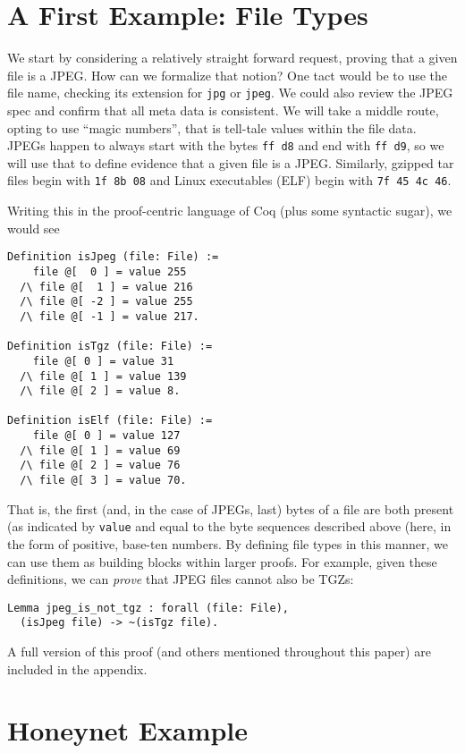 \documentclass[nocopyrightspace]{sigplanconf}
\begin{document}
\section{A First Example: File Types}

We start by considering a relatively straight forward request, proving that a
given file is a JPEG. How can we formalize that notion? One tact would be to
use the file name, checking its extension for {\tt jpg} or {\tt jpeg}. We
could also review the JPEG spec and confirm that all meta data is consistent.
We will take a middle route, opting to use ``magic numbers'', that is
tell-tale values within the file data. JPEGs happen to always start with the
bytes {\tt ff d8} and end with {\tt ff d9}, so we will use that to define
evidence that a given file is a JPEG. Similarly, gzipped tar files begin with
{\tt 1f 8b 08} and Linux executables (ELF) begin with {\tt 7f 45 4c 46}.

Writing this in the proof-centric language of Coq (plus some syntactic sugar),
we would see

\begin{lstlisting}
Definition isJpeg (file: File) :=
    file @[  0 ] = value 255
  /\ file @[  1 ] = value 216 
  /\ file @[ -2 ] = value 255
  /\ file @[ -1 ] = value 217.

Definition isTgz (file: File) :=
    file @[ 0 ] = value 31
  /\ file @[ 1 ] = value 139 
  /\ file @[ 2 ] = value 8.

Definition isElf (file: File) :=
    file @[ 0 ] = value 127
  /\ file @[ 1 ] = value 69 
  /\ file @[ 2 ] = value 76
  /\ file @[ 3 ] = value 70.
\end{lstlisting}

That is, the first (and, in the case of JPEGs, last) bytes of a file are both
present (as indicated by {\tt value} and equal to the byte sequences described
above (here, in the form of positive, base-ten numbers. By defining file types
in this manner, we can use them as building blocks within larger proofs. For
example, given these definitions, we can {\it prove} that JPEG files cannot
also be TGZs:

\begin{lstlisting}
Lemma jpeg_is_not_tgz : forall (file: File),
  (isJpeg file) -> ~(isTgz file).
\end{lstlisting}

A full version of this proof (and others mentioned throughout this paper) are
included in the appendix.

\section{Honeynet Example}
\end{document}
